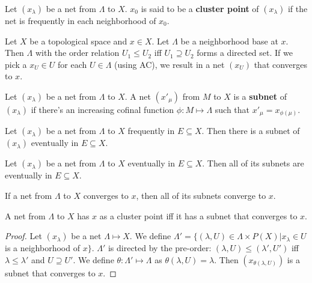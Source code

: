 \documentclass[12pt]{book}
\begin{document}
\begin{definition}
	Let $(x_\lambda)$ be a net from $\Lambda$ to $X$. $x_0$ is said to be a {\bf cluster point} of $(x_\lambda)$ if the net is frequently in each neighborhood of $x_0$.
\end{definition}

\begin{example}
	Let $X$ be a topological space and $x\in X$. Let $\Lambda$ be a neighborhood base at $x$. Then $\Lambda$ with the order relation $U_1\leq U_2$ iff $U_1\supseteq U_2$ forms a directed set. If we pick a $x_U\in U$ for each $U\in\Lambda$ (using AC), we result in a net $(x_U)$ that converges to $x$.
\end{example}

\begin{definition}
	Let $(x_\lambda)$ be a net from $\Lambda$ to $X$. A net $(x'_\mu)$ from $M$ to $X$ is a {\bf subnet} of $(x_\lambda)$ if there's an increasing cofinal function $\phi:M\mapsto\Lambda$ such that $x'_\mu=x_{\phi(\mu)}$.
\end{definition}

\begin{theorem}
	Let $(x_\lambda)$ be a net from $\Lambda$ to $X$ frequently in $E\subseteq X$. Then there is a subnet of $(x_\lambda)$ eventually in $E\subseteq X$.
\end{theorem}

\begin{theorem}
	Let $(x_\lambda)$ be a net from $\Lambda$ to $X$ eventually in $E\subseteq X$. Then all of its subnets are eventually in $E\subseteq X$.
\end{theorem}

\begin{theorem}
	If a net from $\Lambda$ to $X$ converges to $x$, then all of its subnets converge to $x$.
\end{theorem}

\begin{theorem}
	A net from $\Lambda$ to $X$ has $x$ as a cluster point iff it has a subnet that converges to $x$.
	\label{thm:subnet}
\end{theorem}
\begin{proof}
	Let $(x_\lambda)$ be a net $\Lambda\mapsto X$. We define $\Lambda'=\{(\lambda,U)\in\Lambda\times P(X)|x_\lambda\in U $ is a neighborhood of $x\}$. $\Lambda'$ is directed by the pre-order: $(\lambda,U)\leq(\lambda',U')$ iff $\lambda\leq\lambda'$ and $U\supseteq U'$. We define $\theta:\Lambda'\mapsto \Lambda$ as $\theta(\lambda,U)=\lambda$. Then $(x_{\theta(\lambda,U)})$ is a subnet that converges to $x$.
\end{proof}
\end{document}
